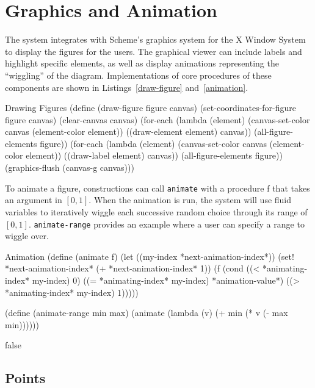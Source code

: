 \section{Graphics and Animation}

The system integrates with Scheme's graphics system for the X Window
System to display the figures for the users. The graphical viewer can
include labels and highlight specific elements, as well as display
animations representing the ``wiggling'' of the
diagram. Implementations of core procedures of these components are
shown in Listings~\ref{draw-figure} and~\ref{animation}.

\begin{code-listing}
[label=draw-figure]
{Drawing Figures}
(define (draw-figure figure canvas)
  (set-coordinates-for-figure figure canvas)
  (clear-canvas canvas)
  (for-each
   (lambda (element)
     (canvas-set-color canvas (element-color element))
     ((draw-element element) canvas))
   (all-figure-elements figure))
  (for-each
   (lambda (element)
     (canvas-set-color canvas (element-color element))
     ((draw-label element) canvas))
   (all-figure-elements figure))
  (graphics-flush (canvas-g canvas)))
\end{code-listing}

To animate a figure, constructions can call \texttt{animate} with a
procedure f that takes an argument in $[0, 1]$. When the animation is
run, the system will use fluid variables to iteratively wiggle each
successive random choice through its range of
$[0,1]$. \texttt{animate-range} provides an example where a user can
specify a range to wiggle over.

\begin{code-listing}
[label=animation]
{Animation}
(define (animate f)
  (let ((my-index *next-animation-index*))
    (set! *next-animation-index* (+ *next-animation-index* 1))
    (f (cond ((< *animating-index* my-index) 0)
             ((= *animating-index* my-index) *animation-value*)
             ((> *animating-index* my-index) 1)))))

(define (animate-range min max)
  (animate (lambda (v)
             (+ min
                (* v (- max min))))))
\end{code-listing}


\if false

\subsection{Points}

